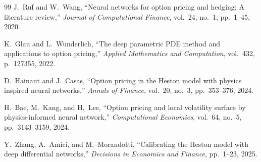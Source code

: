 \documentclass[conference]{IEEEtran}
\begin{document}
\begin{thebibliography}{99}
 J.~Ruf and W.~Wang, ``Neural networks for option pricing and hedging: A literature review,'' \emph{Journal of Computational Finance}, vol.~24, no.~1, pp.~1--45, 2020.

 K.~Glau and L.~Wunderlich, ``The deep parametric PDE method and applications to option pricing,'' \emph{Applied Mathematics and Computation}, vol.~432, p.~127355, 2022.

 D.~Hainaut and J.~Casas, ``Option pricing in the Heston model with physics inspired neural networks,'' \emph{Annals of Finance}, vol.~20, no.~3, pp.~353--376, 2024.

 H.~Bae, M.~Kang, and H.~Lee, ``Option pricing and local volatility surface by physics-informed neural network,'' \emph{Computational Economics}, vol.~64, no.~5, pp.~3143--3159, 2024.

 Y.~Zhang, A.~Amici, and M.~Morandotti, ``Calibrating the Heston model with deep differential networks,'' \emph{Decisions in Economics and Finance}, pp.~1--23, 2025.

\end{thebibliography}
\end{document}
